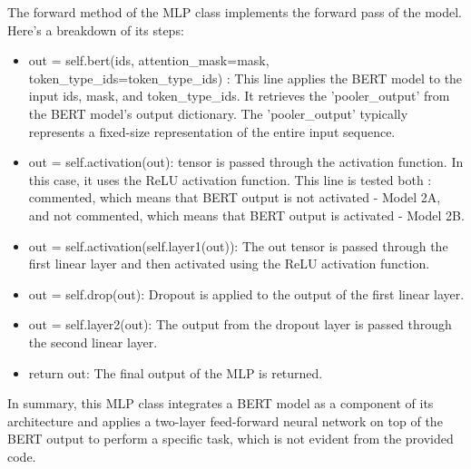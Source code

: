 The forward method of the MLP class implements the forward pass of the model. Here's a breakdown of its steps:
\begin{itemize}
    \item out = self.bert(ids, attention\_mask=mask, token\_type\_ids=token\_type\_ids) : This line applies the BERT model to the input ids, mask, and token\_type\_ids. It retrieves the 'pooler\_output' from the BERT model's output dictionary. The 'pooler\_output' typically represents a fixed-size representation of the entire input sequence.

    \item out = self.activation(out): tensor is passed through the activation function. In this case, it uses the ReLU activation function. This line is tested both : commented, which means that BERT output is not activated - Model 2A, and not commented, which means that BERT output is activated - Model 2B.

    \item out = self.activation(self.layer1(out)): The out tensor is passed through the first linear layer and then activated using the ReLU activation function.

    \item out = self.drop(out): Dropout is applied to the output of the first linear layer.

    \item out = self.layer2(out): The output from the dropout layer is passed through the second linear layer.

    \item return out: The final output of the MLP is returned.
\end{itemize}

In summary, this MLP class integrates a BERT model as a component of its architecture and applies a two-layer feed-forward neural network on top of the BERT output to perform a specific task, which is not evident from the provided code.

